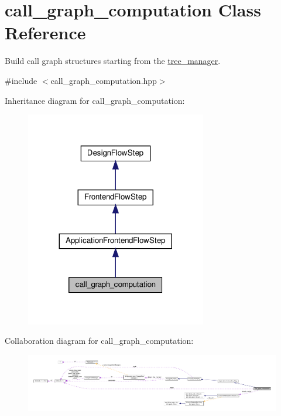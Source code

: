 \hypertarget{classcall__graph__computation}{}\section{call\+\_\+graph\+\_\+computation Class Reference}
\label{classcall__graph__computation}


Build call graph structures starting from the \hyperlink{classtree__manager}{tree\+\_\+manager}.  




{\ttfamily \#include $<$call\+\_\+graph\+\_\+computation.\+hpp$>$}



Inheritance diagram for call\+\_\+graph\+\_\+computation\+:
\nopagebreak
\begin{figure}[H]
\begin{center}
\leavevmode
\includegraphics[width=224pt]{d7/ddc/classcall__graph__computation__inherit__graph}
\end{center}
\end{figure}


Collaboration diagram for call\+\_\+graph\+\_\+computation\+:
\nopagebreak
\begin{figure}[H]
\begin{center}
\leavevmode
\includegraphics[width=350pt]{d4/d55/classcall__graph__computation__coll__graph}
\end{center}
\end{figure}
